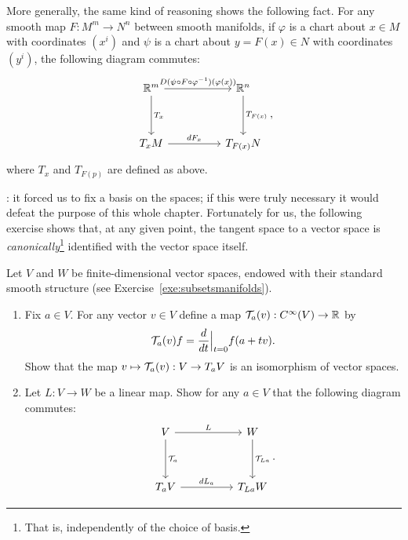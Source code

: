 More generally, the same kind of reasoning shows the following fact. For any smooth map $F:M^m \to N^n$ between smooth manifolds, if $\varphi$ is a chart about $x\in M$ with coordinates $(x^i)$ and $\psi$ is a chart about $y=F(x)\in N$ with coordinates $(y^i)$, the following diagram commutes:
\begin{equation}
  \begin{tikzcd}[row sep=huge, column sep=huge]
    \R^m \arrow[r, "D(\psi \circ F \circ \varphi^{-1})(\varphi(x))"] \arrow[d, "T_x"]
    & \R^n \arrow[d, "T_{F(x)}"] \\
    T_xM \arrow[r, "dF_x"]
    & T_{F(x)}N
  \end{tikzcd},
\end{equation}
where $T_x$ and $T_{F(p)}$ are defined as above.

: it forced us to fix a basis on the spaces; if this were truly necessary it would defeat the purpose of this whole chapter.
Fortunately for us, the following exercise shows that, at any given point, the tangent space to a vector space is \emph{canonically}\footnote{That is, independently of the choice of basis.} identified with the vector space itself.

\begin{exercise}[\textit{[homework 2]}]\label{ex:tg_curve_iso}
  Let $V$ and $W$ be finite-dimensional vector spaces, endowed with their standard smooth structure (see Exercise~\ref{exe:subsetsmanifolds}).
  \begin{enumerate}
    \item Fix $a\in V$. For any vector $v\in V$ define a map $\mathcal{T}_a(v) : C^\infty(V) \to \mathbb{R}$ by
    \begin{equation}
      \mathcal{T}_a(v) f = \frac{d}{dt}\Big|_{t=0} f(a + tv).
    \end{equation}
    Show that the map $v\mapsto \mathcal{T}_a(v) : V \to T_aV$ is an isomorphism of vector spaces.
    \item Let $L:V\to W$ be a linear map. Show for any $a\in V$ that the following diagram commutes:
    \begin{equation}
    \begin{tikzcd}[row sep=huge, column sep=huge]
      V \arrow[r, "L"] \arrow[d, "\cT_a"]
      & W \arrow[d, "\cT_{La}"] \\
      T_aV \arrow[r, "dL_a"]
      & T_{La}W
    \end{tikzcd}.
  \end{equation}
  \end{enumerate}
\end{exercise}

